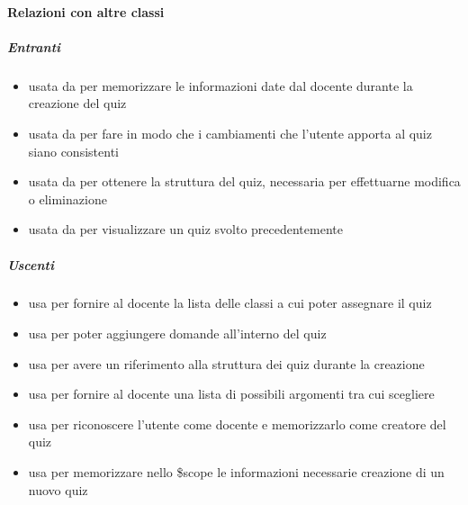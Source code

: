 \paragraph{Relazioni con altre classi}
\subparagraph{Entranti}
\begin{itemize}
\item usata da  per memorizzare le informazioni date dal docente durante la creazione del quiz
\item usata da  per fare in modo che i cambiamenti che l'utente apporta al quiz siano consistenti
\item usata da  per ottenere la struttura del quiz, necessaria per effettuarne modifica o eliminazione
\item usata da  per visualizzare un quiz svolto precedentemente
\end{itemize}
\subparagraph{Uscenti}
\begin{itemize}
\item usa  per fornire al docente la lista delle classi a cui poter assegnare il quiz
\item usa  per poter aggiungere domande all'interno del quiz
\item usa  per avere un riferimento alla struttura dei quiz durante la creazione
\item usa  per fornire al docente una lista di possibili argomenti tra cui scegliere
\item usa  per riconoscere l'utente come docente e memorizzarlo come creatore del quiz
\item usa  per memorizzare nello \$scope le informazioni necessarie creazione di un nuovo quiz
\end{itemize}
